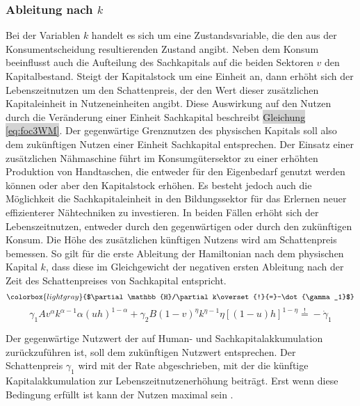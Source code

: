 \subsubsection*{Ableitung nach $k$}
Bei der Variablen $k$ handelt es sich um eine Zustandsvariable, die den aus der Konsumentscheidung resultierenden Zustand angibt. Neben dem Konsum beeinflusst auch die Aufteilung des Sachkapitals auf die beiden Sektoren $v$ den Kapitalbestand. Steigt der Kapitalstock um eine Einheit an, dann erhöht sich der Lebenszeitnutzen um den Schattenpreis, der den Wert dieser zusätzlichen Kapitaleinheit in Nutzeneinheiten angibt. Diese Auswirkung auf den Nutzen durch die Veränderung einer Einheit Sachkapital beschreibt \colorbox{lightgray}{Gleichung \eqref{eq:foc3WM}}. Der gegenwärtige Grenznutzen des physischen Kapitals soll also dem zukünftigen Nutzen einer Einheit Sachkapital entsprechen. Der Einsatz einer zusätzlichen Nähmaschine führt im Konsumgütersektor zu einer erhöhten Produktion von Handtaschen, die entweder für den Eigenbedarf genutzt werden können oder aber den Kapitalstock erhöhen. Es besteht jedoch auch die Möglichkeit die Sachkapitaleinheit in den Bildungssektor für das Erlernen neuer effizienterer Nähtechniken zu investieren. In beiden Fällen erhöht sich der Lebenszeitnutzen, entweder durch den gegenwärtigen oder durch den zukünftigen Konsum. Die Höhe des zusätzlichen künftigen Nutzens wird am Schattenpreis bemessen. So gilt f{\"u}r die erste Ableitung der Hamiltonian nach dem physischen Kapital $k$, dass diese im Gleichgewicht der negativen ersten Ableitung nach der Zeit des Schattenpreises von Sachkapital entspricht. 
\begin{equation}
\colorbox{lightgray}{$\partial\mathbb{H}/\partial k\overset{!}{=}-\dot{\gamma_1}$}\label{nachK}
\end{equation}
\begin{equation}
\gamma_{1}A v^{\alpha}k^{\alpha -1} \alpha(u h)^{1- \alpha} + \gamma_{2}B(1- v)^{\eta} k^{\eta -1} \eta \left [ (1-u)h \right ]^{1- \eta}\overset{!}{=} - \dot{\gamma}_{1}\label{BedingungFoc3WM}
\end{equation}

Der gegenwärtige Nutzwert der auf Human- und Sachkapitalakkumulation zurückzuführen ist, soll dem zukünftigen Nutzwert entsprechen. Der Schattenpreis $\gamma_1$ wird mit der Rate abgeschrieben, mit der die künftige Kapitalakkumulation zur Lebenszeitnutzenerhöhung beiträgt. Erst wenn diese Bedingung erfüllt ist kann der Nutzen maximal sein \citep{Chiang.2000}.

